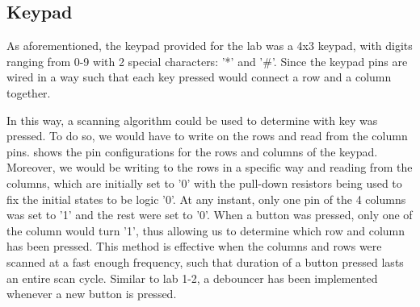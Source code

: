\documentclass[a4paper,titlepage]{article}
\begin{document}
\subsection{Keypad}
As aforementioned, the keypad provided for the lab was a 4x3 keypad, with digits ranging from 0-9 with 2 special characters: '*' and '\#'. Since the keypad pins are wired in a way such that each key pressed would connect a row and a column together.

In this way, a scanning algorithm could be used to determine with key was pressed. To do so, we would have to write on the rows and read from the column pins.  shows the pin configurations for the rows and columns of the keypad. Moreover, we would be writing to the rows in a specific way and reading from the columns, which are initially set to '0' with the pull-down resistors being used to fix the initial states to be logic '0'. At any instant, only one pin of the 4 columns was set to '1' and the rest were set to '0'. When a button was pressed, only one of the column would turn '1', thus allowing us to determine which row and column has been pressed. This method is effective when the columns and rows were scanned at a fast enough frequency, such that duration of a button pressed lasts an entire scan cycle. Similar to lab 1-2, a debouncer has been implemented whenever a new button is pressed.
\end{document}
